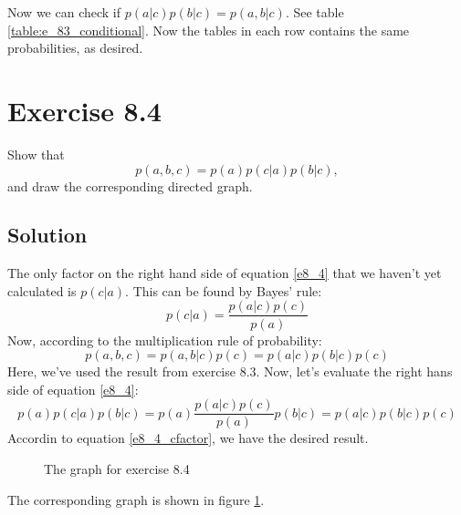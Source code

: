 \documentclass[12pt, a4paper]{article}
\numberwithin{equation}{section}
\begin{document}
Now we can check if $p(a|c)p(b|c)=p(a,b|c)$. See table \ref{table:e_83_conditional}. Now the tables in each row contains the same probabilities, as desired.

\section{Exercise 8.4}
Show that
\begin{equation}
p(a,b,c)=p(a)p(c|a)p(b|c),
\label{e8_4}
\end{equation}
and draw the corresponding directed graph.

\subsection{Solution}
The only factor on the right hand side of equation \ref{e8_4} that we haven't yet calculated is $p(c|a)$. This can be found by Bayes' rule:
\begin{equation}
p(c|a)=\frac{p(a|c)p(c)}{p(a)}
\end{equation}
Now, according to the multiplication rule of probability:
\begin{equation}
p(a,b,c)=p(a,b|c)p(c)=p(a|c)p(b|c)p(c)
\label{e8_4_cfactor}
\end{equation}
Here, we've used the result from exercise 8.3.
Now, let's evaluate the right hans side of equation \ref{e8_4}:
\begin{equation}
p(a)p(c|a)p(b|c)=p(a)\frac{p(a|c)p(c)}{p(a)}p(b|c)=p(a|c)p(b|c)p(c)
\end{equation}
Accordin to equation \ref{e8_4_cfactor}, we have the desired result.

\begin{figure}
\centering
{}
\caption{The graph for exercise 8.4}
\label{graph:e8_4}
\end{figure}

The corresponding graph is shown in figure \ref{graph:e8_4}.
\end{document}
